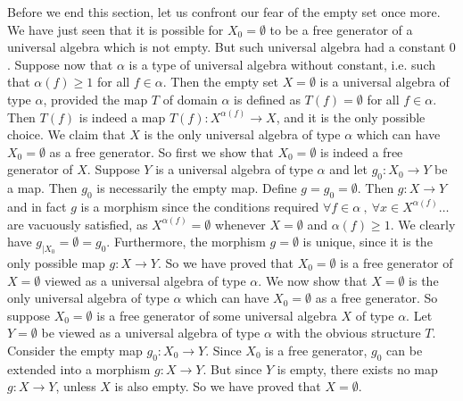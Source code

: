 Before we end this section, let us confront our fear of the empty
set once more. We have just seen that it is possible for
$X_{0}=\emptyset$ to be a free generator of a universal algebra
which is not empty. But such universal algebra had a constant $0$.
Suppose now that $\alpha$ is a type of universal algebra without
constant, i.e. such that $\alpha(f)\geq 1$ for all $f\in\alpha$.
Then the empty set $X=\emptyset$ is a universal algebra of type
$\alpha$, provided the map $T$ of domain $\alpha$ is defined as
$T(f)=\emptyset$ for all $f\in\alpha$. Then $T(f)$ is indeed a map
$T(f):X^{\alpha(f)}\to X$, and it is the only possible choice. We
claim that $X$ is the only universal algebra of type $\alpha$ which
can have $X_{0}=\emptyset$ as a free generator. So first we show
that $X_{0}=\emptyset$ is indeed a free generator of $X$. Suppose
$Y$ is a universal algebra of type $\alpha$ and let $g_{0}:X_{0}\to
Y$ be a map. Then $g_{0}$ is necessarily the empty map. Define
$g=g_{0}=\emptyset$. Then $g:X\to Y$ and in fact $g$ is a morphism
since the conditions required $\forall f\in\alpha\ ,\ \forall x\in
X^{\alpha(f)}\ldots$ are vacuously satisfied, as
$X^{\alpha(f)}=\emptyset$ whenever $X=\emptyset$ and $\alpha(f)\geq
1$. We clearly have $g_{|X_{0}}=\emptyset =g_{0}$. Furthermore, the
morphism $g=\emptyset$ is unique, since it is the only possible map
$g:X\to Y$. So we have proved that $X_{0}=\emptyset$ is a free
generator of $X=\emptyset$ viewed as a universal algebra of type
$\alpha$. We now show that $X=\emptyset$ is the only universal
algebra of type $\alpha$ which can have $X_{0}=\emptyset$ as a free
generator. So suppose $X_{0}=\emptyset$ is a free generator of some
universal algebra $X$ of type $\alpha$. Let $Y=\emptyset$ be viewed
as a universal algebra of type $\alpha$ with the obvious structure
$T$. Consider the empty map $g_{0}:X_{0}\to Y$. Since $X_{0}$ is a
free generator, $g_{0}$ can be extended into a morphism $g:X\to Y$.
But since $Y$ is empty, there exists no map $g:X\to Y$, unless $X$
is also empty. So we have proved that $X=\emptyset$.
